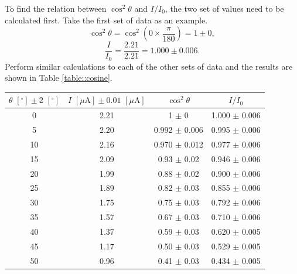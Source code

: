 \documentclass[a4paper]{article}
\begin{document}
To find the relation between $\cos^2\theta$ and $I/I_0$, the two set of values need to be calculated first.
Take the first set of data as an example.
$$\cos^2\theta = \cos^2(0 \times \frac{\pi}{180}) = 1 \pm 0,$$
$$\frac{I}{I_0} = \frac{2.21}{2.21} = 1.000 \pm 0.006.$$
Perform similar calculations to each of the other sets of data and the results are shown in Table \ref{table::cosine}.

\begin{table}[H]
	\centering
	\begin{tabular}{cccc}
		\hline
		$\theta\,\,[^\circ] \pm 2\,\,[^\circ]$ & $I\,\,[\mu\text{A}] \pm 0.01\,\,[\mu\text{A}]$ & $\cos^2\theta$     & $I/I_0$            \\
		\hline
		0                                      & 2.21                                           & 1 $\pm$ 0          & 1.000  $\pm$ 0.006 \\
		5                                      & 2.20                                           & 0.992  $\pm$ 0.006 & 0.995  $\pm$ 0.006 \\
		10                                     & 2.16                                           & 0.970  $\pm$ 0.012 & 0.977  $\pm$ 0.006 \\
		15                                     & 2.09                                           & 0.93  $\pm$ 0.02   & 0.946  $\pm$ 0.006 \\
		20                                     & 1.99                                           & 0.88  $\pm$ 0.02   & 0.900  $\pm$ 0.006 \\
		25                                     & 1.89                                           & 0.82  $\pm$ 0.03   & 0.855  $\pm$ 0.006 \\
		30                                     & 1.75                                           & 0.75  $\pm$ 0.03   & 0.792  $\pm$ 0.006 \\
		35                                     & 1.57                                           & 0.67  $\pm$ 0.03   & 0.710  $\pm$ 0.006 \\
		40                                     & 1.37                                           & 0.59  $\pm$ 0.03   & 0.620  $\pm$ 0.005 \\
		45                                     & 1.17                                           & 0.50  $\pm$ 0.03   & 0.529  $\pm$ 0.005 \\
		50                                     & 0.96                                           & 0.41  $\pm$ 0.03   & 0.434  $\pm$ 0.005 \\

\end{tabular}
\end{table}
\end{document}
